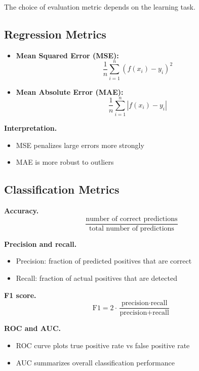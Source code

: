 The choice of evaluation metric depends on the learning task.

\subsection{Regression Metrics}

\begin{itemize}
    \item \textbf{Mean Squared Error (MSE):}
    \[
    \frac{1}{n} \sum_{i=1}^n (f(x_i) - y_i)^2
    \]

    \item \textbf{Mean Absolute Error (MAE):}
    \[
    \frac{1}{n} \sum_{i=1}^n |f(x_i) - y_i|
    \]
\end{itemize}

\medskip

\noindent
\textbf{Interpretation.}
\begin{itemize}
    \item MSE penalizes large errors more strongly
    \item MAE is more robust to outliers
\end{itemize}

\subsection{Classification Metrics}

\medskip

\noindent
\textbf{Accuracy.}
\[
\frac{\text{number of correct predictions}}{\text{total number of predictions}}
\]

\medskip

\noindent
\textbf{Precision and recall.}
\begin{itemize}
    \item Precision: fraction of predicted positives that are correct
    \item Recall: fraction of actual positives that are detected
\end{itemize}

\medskip

\noindent
\textbf{F1 score.}
\[
\text{F1} = 2 \cdot \frac{\text{precision} \cdot \text{recall}}{\text{precision} + \text{recall}}
\]

\medskip

\noindent
\textbf{ROC and AUC.}
\begin{itemize}
    \item ROC curve plots true positive rate vs false positive rate
    \item AUC summarizes overall classification performance
\end{itemize}

